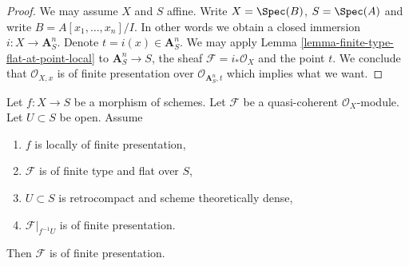 \begin{proof}
We may assume $X$ and $S$ affine. Write $X = \Spec(B)$,
$S = \Spec(A)$ and write $B = A[x_1, \ldots, x_n]/I$.
In other words we obtain a closed immersion $i : X \to \mathbf{A}^n_S$.
Denote $t = i(x) \in \mathbf{A}^n_S$. We may apply
Lemma \ref{lemma-finite-type-flat-at-point-local}
to $\mathbf{A}^n_S \to S$, the sheaf $\mathcal{F} = i_*\mathcal{O}_X$
and the point $t$. We conclude that $\mathcal{O}_{X, x}$ is
of finite presentation over $\mathcal{O}_{\mathbf{A}^n_S, t}$
which implies what we want.
\end{proof}

\begin{lemma}
\label{lemma-flat-finite-type-finitely-presented-over-dense-open}
Let $f : X \to S$ be a morphism of schemes. Let $\mathcal{F}$ be a
quasi-coherent $\mathcal{O}_X$-module. Let $U \subset S$ be open.
Assume
\begin{enumerate}
\item $f$ is locally of finite presentation,
\item $\mathcal{F}$ is of finite type and flat over $S$,
\item $U \subset S$ is retrocompact and scheme theoretically dense,
\item $\mathcal{F}|_{f^{-1}U}$ is of finite presentation.
\end{enumerate}
Then $\mathcal{F}$ is of finite presentation.
\end{lemma}

